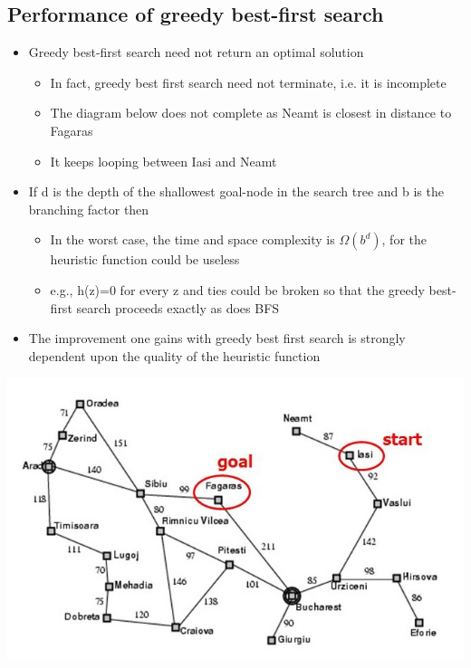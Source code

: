 \documentclass{article}[18pt]
\begin{document}
\subsection{Performance of greedy best-first search}
\begin{itemize}
	\item Greedy best-first search need not return an optimal solution
	\begin{itemize}
		\item In fact, greedy best first search need not terminate, i.e. it is incomplete
		\item The diagram below does not complete as Neamt is closest in distance to Fagaras
		\item It keeps looping between Iasi and Neamt
	\end{itemize}
	\item If d is the depth of the shallowest goal-node in the search tree and b is the branching factor then
	\begin{itemize}
		\item In the worst case, the time and space complexity is $\Omega(b^d)$, for the heuristic function could be useless
		\item e.g., h(z)=0 for every z and ties could be broken so that the greedy best-first search proceeds exactly as does BFS
	\end{itemize}
	\item The improvement one gains with greedy best first search is strongly dependent upon the quality of the heuristic function
\end{itemize}
\begin{center}
	\includegraphics[scale=1]{lasi}
\end{center}
\end{document}
